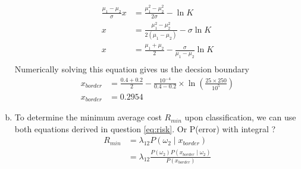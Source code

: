 \documentclass[a4paper, 10pt, twoside]{article}
\begin{document}
\begin{enumerate}[a)]
\begin{align*}
              \frac{\mu_1-\mu_2}{\sigma}x                                           & = \frac{\mu_1^2-\mu_2^2}{2\sigma} - \ln K                     \\
              x                                                                     & = \frac{\mu_1^2-\mu_2^2}{2(\mu_1-\mu_2)} - \sigma\ln K        \\
              x                                                                     & = \frac{\mu_1 + \mu_2}{2} - \frac{\sigma}{\mu_1-\mu_2}\ln K   \\
          \end{align*}
          Numerically solving this equation gives us the decsion boundary
          \begin{align*}
              x_{border} & = \frac{0.4 + 0.2}{2} - \frac{10^{-4}}{0.4-0.2} \times \ln (\frac{25\times250}{10^5}) \\
              x_{border} & = 0.2954
          \end{align*}
    \item To determine the minimum average cost $R_{min}$ upon classification, we can use both equations derived in question \ref{eq:risk}. Or P(error) with integral ?
          \begin{align*}
              R_{min} & = \lambda_{12}P(\omega_2 \mid x_{border})                                  \\
                      & = \lambda_{12}\frac{P(\omega_2)P(x_{border} \mid \omega_2)}{P(x_{border})} \\
          \end{align*}
\end{enumerate}
\end{document}
